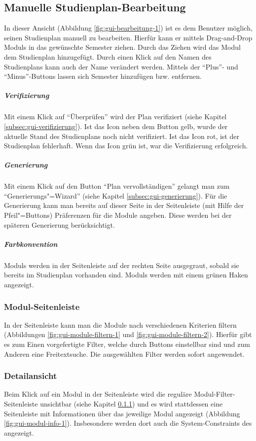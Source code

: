 \subsection{Manuelle Studienplan-Bearbeitung}
\label{subsec:gui-manuelle-bearbeitung}
In dieser Ansicht (Abbildung \ref{fig:gui-bearbeitung-1}) ist es dem \gls{Benutzer} möglich, seinen \gls{Studienplan} manuell zu bearbeiten. Hierfür kann er mittels \gls{Drag-and-Drop} \glspl{Modul}   in das gewünschte Semester ziehen. Durch das Ziehen wird das \gls{Modul} dem \gls{Studienplan} hinzugefügt. Durch einen Klick auf den Namen des \gls{Studienplan}s kann auch der Name verändert werden. Mittels der \enquote{Plus}- und \enquote{Minus}-Buttons lassen sich Semester hinzufügen bzw. entfernen.
\subparagraph{Verifizierung}
Mit einem Klick auf \enquote{Überprüfen} wird der Plan verifiziert (siehe Kapitel \ref{subsec:gui-verifizierung}).\newline
Ist das Icon neben dem Button gelb, wurde der aktuelle Stand des \gls{Studienplan}s noch nicht verifiziert. Ist das Icon rot, ist der \gls{Studienplan} fehlerhaft. Wenn das Icon grün ist, war die Verifizierung erfolgreich.
\subparagraph{Generierung}
Mit einem Klick auf den Button \enquote{Plan vervollständigen} gelangt man zum \enquote{Generierungs"=Wizard} (siehe Kapitel \ref{subsec:gui-generierung}). Für die Generierung kann man bereits auf dieser Seite in der Seitenleiste (mit Hilfe der Pfeil"=Buttons) Präferenzen für die Module angeben. Diese werden bei der späteren Generierung berücksichtigt.
\subparagraph{Farbkonvention}
\glspl{Modul} werden in der Seitenleiste auf der rechten Seite ausgegraut, sobald sie bereits im \gls{Studienplan} vorhanden sind.\newline
{} \glspl{Modul} werden mit einem grünen Haken angezeigt.


\subsubsection{Modul-Seitenleiste}
\label{subsec:gui-modul-sidebar}
In der Seitenleiste kann man die Module nach verschiedenen Kriterien filtern (Abbildungen \ref{fig:gui-module-filtern-1} und \ref{fig:gui-module-filtern-2}). Hierfür gibt es zum Einen vorgefertigte Filter, welche durch Buttons einstellbar sind und zum Anderen eine Freitextsuche. Die ausgewählten Filter werden sofort angewendet.


\subsubsection{Detailansicht}
Beim Klick auf ein Modul in der Seitenleiste wird die reguläre Modul-Filter-Seitenleiste unsichtbar (siehe Kapitel \ref{subsec:gui-modul-sidebar}) und es wird stattdessen eine Seitenleiste mit Informationen über das jeweilige Modul angezeigt (Abbildung \ref{fig:gui-modul-info-1}). Insbesondere werden dort auch die \glspl{System-Constraint} des  angezeigt.



